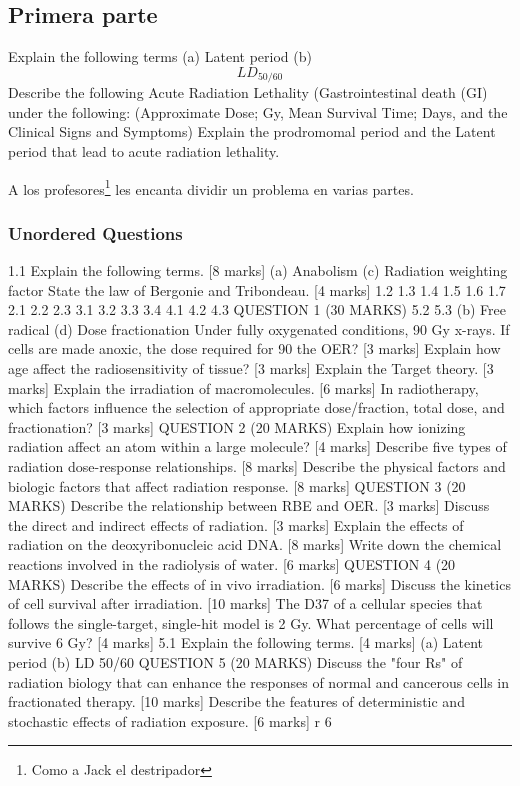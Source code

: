 \documentclass{assignment}
\begin{document}
\begin{problem}
\subsection{Primera parte}
\noindent Explain the following terms (a) Latent period (b) \begin{equation}
    LD_{50/60}
\end{equation}
\noindent Describe the following Acute Radiation Lethality (Gastrointestinal death (GI) under the following:
(Approximate Dose; Gy, Mean Survival Time; Days, and the Clinical Signs and Symptoms)
\noindent Explain the prodromomal period and the Latent period that lead to acute radiation lethality.

\noindent A los profesores\footnote{Como a Jack el destripador} les encanta dividir un problema en varias partes.

\subsubsection*{Unordered Questions}
1.1 Explain the following terms. [8 marks]
(a) Anabolism
(c) Radiation weighting factor
State the law of Bergonie and Tribondeau. [4 marks]
1.2
1.3
1.4
1.5
1.6
1.7
2.1
2.2
2.3
3.1
3.2
3.3
3.4
4.1
4.2
4.3
QUESTION 1 (30 MARKS)
5.2
5.3
(b) Free radical
(d) Dose fractionation
Under fully oxygenated conditions, 90%
Gy x-rays. If cells are made anoxic, the dose required for 90%
the OER? [3 marks]
Explain how age affect the radiosensitivity of tissue? [3 marks]
Explain the Target theory. [3 marks]
Explain the irradiation of macromolecules. [6 marks]
In radiotherapy, which factors influence the selection of appropriate dose/fraction, total
dose, and fractionation? [3 marks]
QUESTION 2 (20 MARKS)
Explain how ionizing radiation affect an atom within a large molecule? [4 marks]
Describe five types of radiation dose-response relationships. [8 marks]
Describe the physical factors and biologic factors that affect radiation response. [8 marks]
QUESTION 3 (20 MARKS)
Describe the relationship between RBE and OER. [3 marks]
Discuss the direct and indirect effects of radiation. [3 marks]
Explain the effects of radiation on the deoxyribonucleic acid DNA. [8 marks]
Write down the chemical reactions involved in the radiolysis of water. [6 marks]
QUESTION 4 (20 MARKS)
Describe the effects of in vivo irradiation. [6 marks]
Discuss the kinetics of cell survival after irradiation. [10 marks]
The D37 of a cellular species that follows the single-target, single-hit model is 2 Gy. What
percentage of cells will survive 6 Gy? [4 marks]
5.1 Explain the following terms. [4 marks]
(a) Latent period
(b) LD 50/60
QUESTION 5 (20 MARKS)
Discuss the "four Rs" of radiation biology that can enhance the responses of normal and
cancerous cells in fractionated therapy. [10 marks]
Describe the features of deterministic and stochastic effects of radiation exposure.
[6 marks]
r
6


\end{problem}
\end{document}

